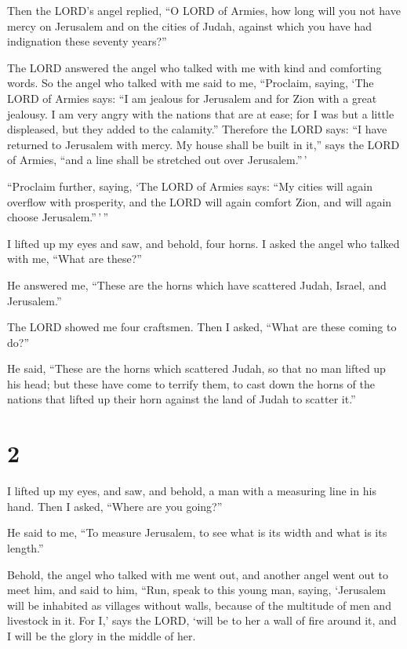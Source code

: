  Then the LORD's angel replied, ``O LORD of Armies, how
long will you not have mercy on Jerusalem and on the cities of Judah,
against which you have had indignation these seventy years?''

 The LORD answered the angel who talked with me with kind
and comforting words.  So the angel who talked with me said
to me, ``Proclaim, saying, `The LORD of Armies says: ``I am jealous for
Jerusalem and for Zion with a great jealousy.  I am very
angry with the nations that are at ease; for I was but a little
displeased, but they added to the calamity.''  Therefore
the LORD says: ``I have returned to Jerusalem with mercy. My house shall
be built in it,'' says the LORD of Armies, ``and a line shall be
stretched out over Jerusalem.''\,'

 ``Proclaim further, saying, `The LORD of Armies says: ``My
cities will again overflow with prosperity, and the LORD will again
comfort Zion, and will again choose Jerusalem.''\,'\,''

 I lifted up my eyes and saw, and behold, four horns.
 I asked the angel who talked with me, ``What are these?''

He answered me, ``These are the horns which have scattered Judah,
Israel, and Jerusalem.''

 The LORD showed me four craftsmen.  Then I
asked, ``What are these coming to do?''

He said, ``These are the horns which scattered Judah, so that no man
lifted up his head; but these have come to terrify them, to cast down
the horns of the nations that lifted up their horn against the land of
Judah to scatter it.''

\hypertarget{section-1}{%
\section{2}\label{section-1}}

 I lifted up my eyes, and saw, and behold, a man with a
measuring line in his hand.  Then I asked, ``Where are you
going?''

He said to me, ``To measure Jerusalem, to see what is its width and what
is its length.''

 Behold, the angel who talked with me went out, and another
angel went out to meet him,  and said to him, ``Run, speak
to this young man, saying, `Jerusalem will be inhabited as villages
without walls, because of the multitude of men and livestock in it.
 For I,' says the LORD, `will be to her a wall of fire
around it, and I will be the glory in the middle of her.

